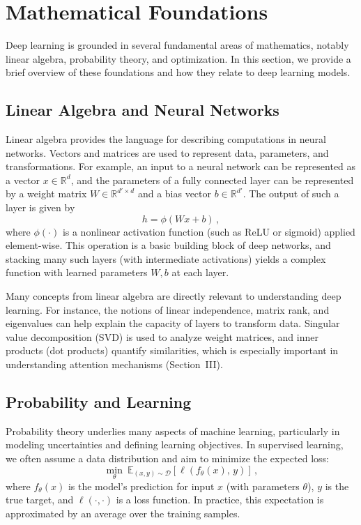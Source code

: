 \documentclass[conference]{IEEEtran}
\begin{document}
\section{Mathematical Foundations}
Deep learning is grounded in several fundamental areas of mathematics, notably linear algebra, probability theory, and optimization. In this section, we provide a brief overview of these foundations and how they relate to deep learning models.

\subsection{Linear Algebra and Neural Networks}
Linear algebra provides the language for describing computations in neural networks. Vectors and matrices are used to represent data, parameters, and transformations. For example, an input to a neural network can be represented as a vector $x \in \mathbb{R}^d$, and the parameters of a fully connected layer can be represented by a weight matrix $W \in \mathbb{R}^{d' \times d}$ and a bias vector $b \in \mathbb{R}^{d'}$. The output of such a layer is given by
\begin{equation}
h = \phi(Wx + b)\,,
\end{equation}
where $\phi(\cdot)$ is a nonlinear activation function (such as ReLU or sigmoid) applied element-wise. This operation is a basic building block of deep networks, and stacking many such layers (with intermediate activations) yields a complex function with learned parameters $W, b$ at each layer.

Many concepts from linear algebra are directly relevant to understanding deep learning. For instance, the notions of linear independence, matrix rank, and eigenvalues can help explain the capacity of layers to transform data. Singular value decomposition (SVD) is used to analyze weight matrices, and inner products (dot products) quantify similarities, which is especially important in understanding attention mechanisms (Section~III).

\subsection{Probability and Learning}
Probability theory underlies many aspects of machine learning, particularly in modeling uncertainties and defining learning objectives. In supervised learning, we often assume a data distribution and aim to minimize the expected loss:
\begin{equation}
\min_{\theta} \ \mathbb{E}_{(x,y)\sim \mathcal{D}}[\ell(f_{\theta}(x),\,y)]\,,
\end{equation}
where $f_{\theta}(x)$ is the model's prediction for input $x$ (with parameters $\theta$), $y$ is the true target, and $\ell(\cdot,\cdot)$ is a loss function. In practice, this expectation is approximated by an average over the training samples.
\end{document}
